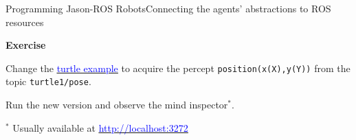 \documentclass[compress]{beamer}
\newcommand{\link}[2]{\href{#1}{\underline{\textcolor{blue}{#2}}}}
\begin{document}
\begin{frame}[fragile]{Programming Jason-ROS Robots}{Connecting the agents' abstractions to ROS resources}

{\bf Exercise}

\vspace{2em}

Change the \link{https://github.com/issia-2026-jason-ros/turtle-example}{turtle example} to acquire the percept \texttt{position(x(X),y(Y))} from the topic \texttt{turtle1/pose}.

\vspace{1em}

Run the new version and observe the mind inspector$^*$.

\vspace{3em}
\tiny
$^*$ Usually available at \link{http://localhost:3272}{http://localhost:3272}

\end{frame}
\end{document}
